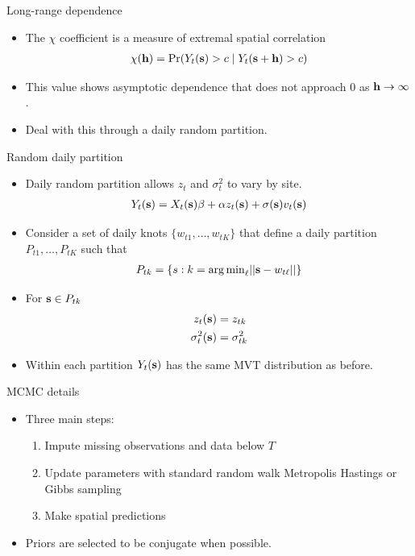 \documentclass{beamer}
\begin{document}
\begin{frame}{Long-range dependence}
  \begin{itemize} \setlength{\itemsep}{0.5em}
    \item The $\chi$ coefficient is a measure of extremal spatial correlation
    \begin{align*}
      \chi(\mbox{\bf h}) = \Pr(Y_t(\mbox{\bf s}) > c \mid Y_t(\mbox{\bf s} + \mbox{\bf h}) > c)
    \end{align*}
    \item This value shows asymptotic dependence that does not approach 0 as $\mbox{\bf h} \rightarrow \infty$.
    \item Deal with this through a daily random partition.
  \end{itemize}
\end{frame}

\begin{frame}{Random daily partition}
  \begin{itemize} \setlength{\itemsep}{0.5em}
    \item Daily random partition allows $z_t$ and $\sigma^2_t$ to vary by site.
    \begin{align*}
      Y_t(\mbox{\bf s}) = X_t(\mbox{\bf s}) \beta + \alpha z_t(\mbox{\bf s}) + \sigma(\mbox{\bf s}) v_t(\mbox{\bf s})
    \end{align*}
    \item Consider a set of daily knots $\{w_{t1}, \ldots, w_{tK}\}$ that define a daily partition
    $P_{t1}, \ldots, P_{tK}$ such that
    \begin{align*}
      P_{tk} = \{s : k = {\mathop{\rm arg\, min}}_\ell|| \mbox{\bf s} - w_{t\ell}|| \}
    \end{align*}
    \item For $\mbox{\bf s} \in P_{tk}$
    \begin{align*}
      z_t(\mbox{\bf s}) &= z_{tk}\\
      \sigma^2_t(\mbox{\bf s}) &= \sigma^2_{tk}
    \end{align*}
    \item Within each partition $Y_t(\mbox{\bf s})$ has the same MVT distribution as before.
  \end{itemize}
\end{frame}


\begin{frame}{MCMC details}
  \begin{itemize} \setlength{\itemsep}{0.5em}
    \item Three main steps:
    \begin{enumerate}[1.]
      \item Impute missing observations and data below $T$
      \item Update parameters with standard random walk Metropolis Hastings or Gibbs sampling
      \item Make spatial predictions
    \end{enumerate}
    \item Priors are selected to be conjugate when possible.
  \end{itemize}
\end{frame}
\end{document}
